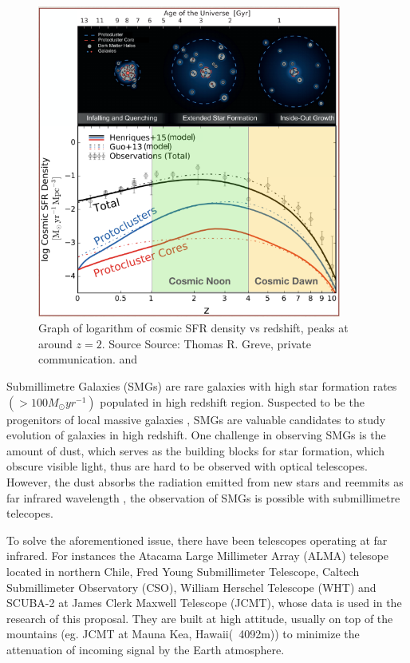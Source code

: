 \documentclass{article}
\begin{document}
\begin{figure}
    \centering
    \includegraphics[width=100mm]{cosmic noon.png}
    \caption{Graph of logarithm of cosmic SFR density vs redshift, peaks at around $z = 2$. Source Source: Thomas R. Greve, private communication. and \parencite{Chiang2017}}
    \label{fig:cosmicnoon}
\end{figure}


\noindent Submillimetre Galaxies (SMGs) are rare galaxies with high star formation rates $(>100M_\odot yr^{-1})$ \parencite{DaCunha2021} populated in high redshift region. Suspected to be the progenitors of local massive galaxies \parencite{Casey2014}, SMGs are valuable candidates to study evolution of galaxies in high redshift. One challenge in observing SMGs is the amount of dust, which serves as the building blocks for star formation, which obscure visible light, thus are hard to be observed with optical telescopes. However, the dust absorbs the radiation emitted from new stars and reemmits as far infrared wavelength \parencite{Casey2014}, the observation of SMGs is possible with submillimetre telecopes. 
\medskip

\noindent To solve the aforementioned issue, there have been telescopes operating at far infrared. For instances the Atacama Large Millimeter Array (ALMA) telesope located in northern Chile, Fred Young Submillimeter Telescope, Caltech Submillimeter Observatory (CSO), William Herschel Telescope (WHT)\parencite{Phillips2013} and SCUBA-2 at James Clerk Maxwell Telescope (JCMT), whose data is used in the research of this proposal. They are built at high attitude, usually on top of the mountains (eg. JCMT at Mauna Kea, Hawaii(~4092m)) to minimize the attenuation of incoming signal by the Earth atmosphere.\parencite{Phillips2013}
\medskip
\end{document}
